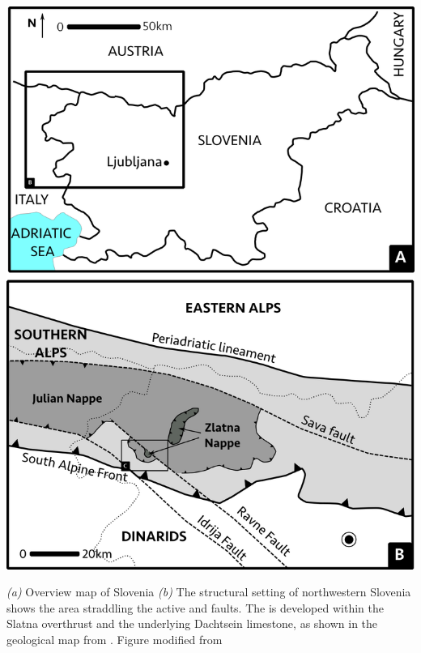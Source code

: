 \begin{map}[b!]
\checkoddpage \ifoddpage \forcerectofloat \else \forceversofloat \fi
\includegraphics[width = \textwidth]{images/maps-of-mig/geology_large.png}
\caption[Structural setting of NW Slovenia]{\emph{(a)} Overview map of Slovenia \emph{(b)} The structural setting of northwestern Slovenia shows the \protect{} area straddling the active \protect{} and \protect{} faults. The \protect{} is developed within the Slatna overthrust and the underlying Dachtsein limestone, as shown in the geological map from \citet{buser1986tolmavc}. Figure modified from \citet{vsmuc2009tectonic}}
\label{map:geol large scale}
\end{map}


 
